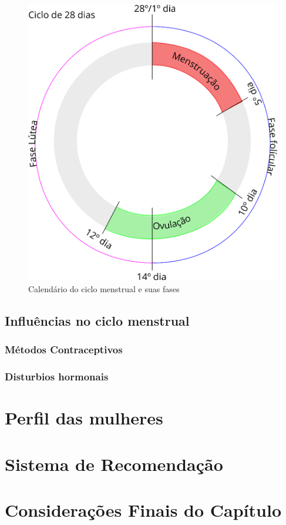 \begin{figure}[h]
	\centering
	\includegraphics[keepaspectratio=true,scale=0.3]{figuras/calendario.eps}
	\caption{Calendário do ciclo menstrual e suas fases}
        \label{fig02}
\end{figure}

\subsection{Influências no ciclo menstrual}

\subsubsection{Métodos Contraceptivos}

\subsubsection{Disturbios hormonais}

\section{Perfil das mulheres}

\section{Sistema de Recomendação}

\section{Considerações Finais do Capítulo}

